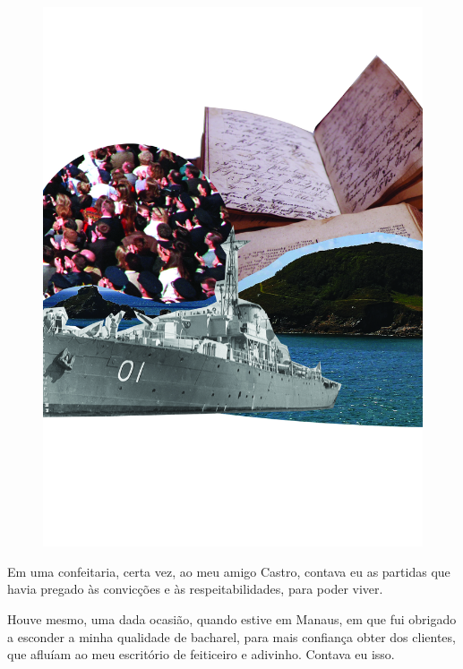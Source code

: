 \pagebreak
\thispagestyle{empty}
\begin{figure}
\vspace*{-.5cm}
\hspace*{-2.3cm}\includegraphics[width=140mm]{../ilustracoes/09_JAVANES.jpg}
\end{figure}
\pagebreak


\noindent{}Em uma confeitaria, certa vez, ao meu amigo Castro, contava eu as
partidas que havia pregado às convicções e às respeitabilidades, para
poder viver.

Houve mesmo, uma dada ocasião, quando estive em Manaus, em que fui
obrigado a esconder a minha qualidade de bacharel, para mais confiança
obter dos clientes, que afluíam ao meu escritório de feiticeiro e
adivinho. Contava eu isso.

